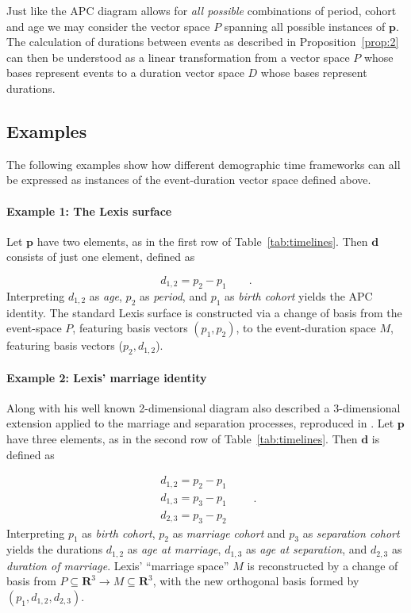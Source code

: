 \documentclass[12pt,oneside,a4paper,doublespacing]{article} %
\theoremstyle{definition}
\begin{document}
Just like the APC diagram allows for \emph{all possible} combinations of period,
cohort and age we may consider the vector space $P$ spanning all possible
instances of $\boldsymbol{p}$. The calculation of durations between events as
described in Proposition~\ref{prop:2} can then be understood as a linear
transformation from a vector space $P$ whose bases represent events to a
duration vector space $D$ whose bases represent durations.

\FloatBarrier
\subsection{Examples}
\label{sec:examples}
The following examples show how different demographic time frameworks can all be expressed as instances of the event-duration vector space defined above.

\paragraph{Example 1: The Lexis surface}

Let $\boldsymbol{p}$ have two elements, as in the first row of
Table~\ref{tab:timelines}. Then $\boldsymbol{d}$ consists of just one element, defined as

\begin{equation}
d_{1,2} = p_2 - p_1   \quad\quad.
\end{equation}
%
Interpreting $d_{1,2}$ as \emph{age}, $p_2$ as \emph{period}, and $p_1$ as
\emph{birth cohort} yields the APC identity. The standard Lexis surface is
constructed via a change of basis from the event-space $P$, featuring basis vectors $(p_1,
p_2)$, to the event-duration space $M$, featuring basis vectors ($p_2, d_{1,2}$).

\paragraph{Example 2: Lexis' marriage identity}

Along with his well known 2-dimensional diagram \citet{lexis1875einleitung} also
described a 3-dimensional extension applied to the marriage and
separation processes, reproduced in \citet{keiding2006event}. Let $\boldsymbol{p}$ have three elements, as in the second row of
Table~\ref{tab:timelines}. Then $\boldsymbol{d}$ is defined as

\begin{equation}
\label{eq:p3}
\begin{matrix}
d_{1,2} = p_2 - p_1\\
d_{1,3} = p_3 - p_1\\
d_{2,3} = p_3 - p_2
\end{matrix} \quad\quad.
\end{equation}
%
Interpreting $p_1$ as \textit{birth cohort}, $p_2$ as \textit{marriage cohort} and $p_3$ as
\textit{separation cohort} yields the durations $d_{1,2}$ as \textit{age at
marriage}, $d_{1,3}$ as \textit{age at separation}, and $d_{2,3}$ as
\textit{duration of marriage}. Lexis' ``marriage space'' $M$ is reconstructed by
a change of basis from $P\subseteq\mathbf{R}^3\to M\subseteq\mathbf{R}^3$, with
the new orthogonal basis formed by $(p_1, d_{1,2}, d_{2,3})$.
\end{document}
